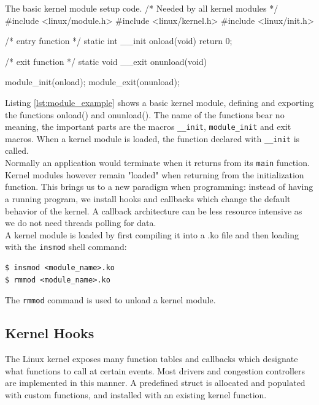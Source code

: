 \documentclass[a4paper,english, 11pt]{report}
\begin{document}
\begin{autonumlstlisting}[label=lst:module_example]{The basic kernel module setup code.}
/* Needed by all kernel modules */
#include <linux/module.h> 
#include <linux/kernel.h>
#include <linux/init.h>

/* entry function */
static int __init onload(void) {
    return 0;
}

/* exit function */
static void __exit onunload(void) {
    
}

module_init(onload);
module_exit(onunload);
\end{autonumlstlisting}

Listing \ref{lst:module_example} shows a basic kernel module, defining and exporting the functions onload() and onunload(). The name of the functions bear no meaning, the important parts are the macros \verb|__init|, \verb|module_init| and exit macros\cite{lkm}. When a kernel module is loaded, the function declared with \verb|__init| is called.\\

Normally an application would terminate when it returns from its \verb|main| function. Kernel modules however remain "loaded" when returning from the initialization function. This brings us to a new paradigm when programming: instead of having a running program, we install hooks and callbacks which change the default behavior of the kernel. A callback architecture can be less resource intensive as we do not need threads polling for data.\\

A kernel module is loaded by first compiling it into a .ko file and then loading with the \verb|insmod| shell command:
\begin{verbatim}
$ insmod <module_name>.ko
$ rmmod <module_name>.ko
\end{verbatim}
The \verb|rmmod| command is used to unload a kernel module. 

\subsection{Kernel Hooks}
The Linux kernel exposes many function tables and callbacks which designate what functions to call at certain events. Most drivers and congestion controllers are implemented in this manner. A predefined struct is allocated and populated with custom functions, and installed with an existing kernel function.
\end{document}
